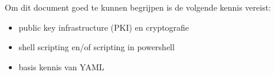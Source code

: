 Om dit document goed te kunnen begrijpen is de volgende kennis vereist:
\begin{itemize}
\item public key infrastructure (PKI) en cryptografie
\item shell scripting en/of scripting in powershell
\item basis kennis van YAML
\end{itemize}
